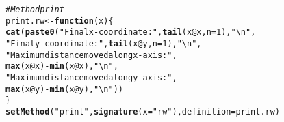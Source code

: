 \documentclass{article}\usepackage[]{graphicx}\usepackage[]{color}
\makeatletter
\newcommand{\hlnum}[1]{\textcolor[rgb]{0.686,0.059,0.569}{#1}}%
\newcommand{\hlstr}[1]{\textcolor[rgb]{0.192,0.494,0.8}{#1}}%
\newcommand{\hlcom}[1]{\textcolor[rgb]{0.678,0.584,0.686}{\textit{#1}}}%
\newcommand{\hlopt}[1]{\textcolor[rgb]{0,0,0}{#1}}%
\newcommand{\hlstd}[1]{\textcolor[rgb]{0.345,0.345,0.345}{#1}}%
\newcommand{\hlkwa}[1]{\textcolor[rgb]{0.161,0.373,0.58}{\textbf{#1}}}%
\newcommand{\hlkwb}[1]{\textcolor[rgb]{0.69,0.353,0.396}{#1}}%
\newcommand{\hlkwc}[1]{\textcolor[rgb]{0.333,0.667,0.333}{#1}}%
\newcommand{\hlkwd}[1]{\textcolor[rgb]{0.737,0.353,0.396}{\textbf{#1}}}%
\newenvironment{kframe}{%
 \def\at@end@of@kframe{}%
 \ifinner\ifhmode%
  \def\at@end@of@kframe{\end{minipage}}%
  \begin{minipage}{\columnwidth}%
 \fi\fi%
 \def\FrameCommand##1{\hskip\@totalleftmargin \hskip-\fboxsep
 \colorbox{shadecolor}{##1}\hskip-\fboxsep
     \hskip-\linewidth \hskip-\@totalleftmargin \hskip\columnwidth}%
 \MakeFramed {\advance\hsize-\width
   \@totalleftmargin\z@ \linewidth\hsize
   \@setminipage}}%
 {\par\unskip\endMakeFramed%
 \at@end@of@kframe}
\newenvironment{knitrout}{}{} %
\makeatother
\begin{document}
\begin{knitrout}
\begin{kframe}
\begin{alltt}
 \hlcom{# Method print}
\hlstd{print.rw} \hlkwb{<-} \hlkwa{function}\hlstd{(}\hlkwc{x}\hlstd{) \{}
  \hlkwd{cat}\hlstd{(}\hlkwd{paste0}\hlstd{(}\hlstr{"Final x-coordinate: "}\hlstd{,} \hlkwd{tail}\hlstd{(x}\hlopt{@}\hlkwc{x}\hlstd{,} \hlkwc{n} \hlstd{=} \hlnum{1}\hlstd{),} \hlstr{"\textbackslash{}n"}\hlstd{,}
             \hlstr{"Final y-coordinate: "}\hlstd{,} \hlkwd{tail}\hlstd{(x}\hlopt{@}\hlkwc{y}\hlstd{,} \hlkwc{n} \hlstd{=} \hlnum{1}\hlstd{),} \hlstr{"\textbackslash{}n"}\hlstd{,}
             \hlstr{"Maximum distance moved along x-axis: "}\hlstd{,}
             \hlkwd{max}\hlstd{(x}\hlopt{@}\hlkwc{x}\hlstd{)} \hlopt{-} \hlkwd{min}\hlstd{(x}\hlopt{@}\hlkwc{x}\hlstd{),} \hlstr{"\textbackslash{}n"}\hlstd{,}
             \hlstr{"Maximum distance moved along y-axis: "}\hlstd{,}
             \hlkwd{max}\hlstd{(x}\hlopt{@}\hlkwc{y}\hlstd{)} \hlopt{-} \hlkwd{min}\hlstd{(x}\hlopt{@}\hlkwc{y}\hlstd{),} \hlstr{"\textbackslash{}n"}\hlstd{))}
\hlstd{\}}
\hlkwd{setMethod}\hlstd{(}\hlstr{"print"}\hlstd{,} \hlkwd{signature}\hlstd{(}\hlkwc{x} \hlstd{=} \hlstr{"rw"}\hlstd{),} \hlkwc{definition} \hlstd{= print.rw)}
\end{alltt}



\end{kframe}
\end{knitrout}
\end{document}
